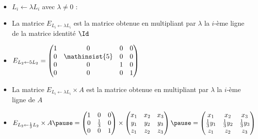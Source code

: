 \begin{frame}
\begin{itemize}\setlength{\itemsep}{8pt}
  \item $L_i \leftarrow \lambda L_i$ avec $\lambda \neq 0$ : 
\pause
  \item La matrice $E_{L_i \leftarrow \lambda L_i}$ est la matrice obtenue en 
    multipliant par $\lambda$ la $i$-ème ligne de la matrice identité $\Id$     
\pause
  \item  $ E_{L_2 \leftarrow 5 L_2}=
    \begin{pmatrix}
    1 & 0 & 0 & 0\\
    0 & \mathinsist{5} & 0 & 0\\
    0 & 0 & 1 & 0\\
    0 & 0 & 0 & 1\end{pmatrix}$
\pause    
  \item La matrice $E_{L_i \leftarrow \lambda L_i} \times A$ est la matrice obtenue en 
    multipliant par $\lambda$ la $i$-ème ligne de $A$
\pause  
  \item $E_{L_2 \leftarrow \frac13 L_2}  \times A
  \pause
= \begin{pmatrix}
  1&0&0\\0&\frac13&0\\0&0&1  
  \end{pmatrix}
  \times
  \begin{pmatrix}
  x_1&x_2&x_3\\y_1&y_2&y_3\\z_1&z_2&z_3  
  \end{pmatrix}
  \pause
  =   \begin{pmatrix}
  x_1&x_2&x_3\\ \frac13y_1&\frac13y_2&\frac13y_3\\z_1&z_2&z_3  
  \end{pmatrix}
$
\end{itemize}

\end{frame}



